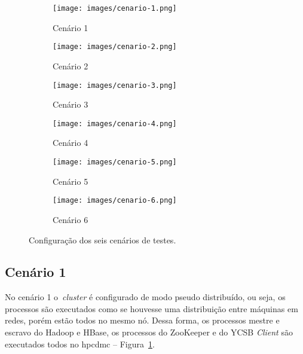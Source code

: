 \documentclass[12pt]{article}
\begin{document}
\begin{figure}
	\centering
	\hspace{0.2cm}
    \begin{subfigure}{0.2\textwidth}
    	\centering
        \texttt{[image: images/cenario-1.png]}
        \caption{Cenário 1}
        \label{figura2a}
    \end{subfigure}
    \hspace{0.3cm}
    \begin{subfigure}{0.3\textwidth}   
    	\centering
        \texttt{[image: images/cenario-2.png]}
        \caption{Cenário 2}%
        \label{figura2b}
    \end{subfigure}
    \hspace{0.4cm}
    \begin{subfigure}{0.3\textwidth}
    	\centering
        \texttt{[image: images/cenario-3.png]}
        \caption{Cenário 3}
        \label{figura2c}
    \end{subfigure}
    \medskip
    \begin{subfigure}{0.3\textwidth}   
    	\centering
        \texttt{[image: images/cenario-4.png]}
        \caption{Cenário 4}%
        \label{figura2d}
    \end{subfigure}
    \begin{subfigure}{0.3\textwidth}
    	\centering
        \texttt{[image: images/cenario-5.png]}
        \caption{Cenário 5}
        \label{figura2e}
    \end{subfigure}
    \begin{subfigure}{0.35\textwidth}   
    	\centering
        \texttt{[image: images/cenario-6.png]}
        \caption{Cenário 6}%
        \label{figura2f}
    \end{subfigure}
    \caption{Configuração dos seis cenários de testes.}
\end{figure}

\subsection{Cenário 1}

No cenário 1 o~\emph{cluster} é configurado de modo pseudo distribuído, ou seja, os processos são executados como se houvesse uma distribuição entre máquinas em redes, porém estão todos no mesmo nó. Dessa forma, os processos mestre e escravo do Hadoop e HBase, os processos do ZooKeeper e do YCSB \emph{Client} são executados todos no hpcdmc -- Figura~\ref{figura2a}.
\end{document}
